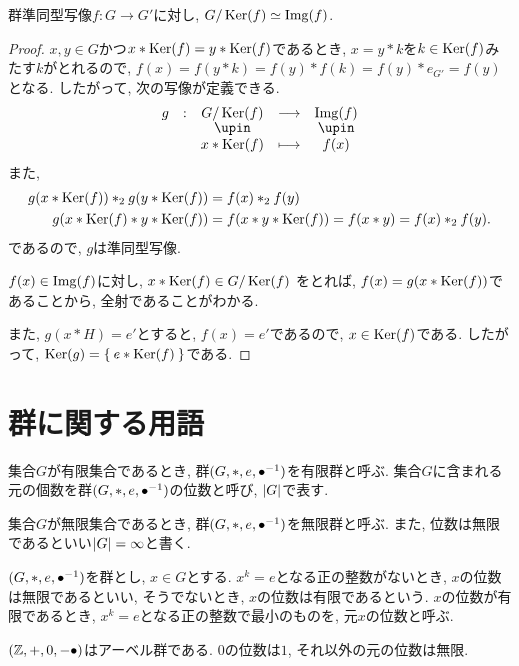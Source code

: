 \begin{theorem}
  群準同型写像$f\colon G \to G'$に対し,
  $G/\operatorname{Ker}(f)\simeq \operatorname{Img}(f)$.
\end{theorem}
\begin{proof}
  $x,y\in G$かつ$x\ast \operatorname{Ker}(f)=y\ast\operatorname{Ker}(f)$であるとき,
  $x=y\ast k$を$k\in \operatorname{Ker}(f)$みたす$k$がとれるので,
  $f(x)=f(y\ast k)=f(y)\ast f(k)=f(y)\ast e_{G'}=f(y)$となる.
  したがって, 次の写像が定義できる.
  \begin{align*}
    \shazo{g}{G/\Ker(f)}{\Img(f)}{x\ast \Ker(f)}{f(x)}
  \end{align*}
  また,
  \begin{align*}
      g(x\ast \operatorname{Ker}(f))\ast_2 g(y\ast \operatorname{Ker}(f))&=f(x)\ast_2 f(y) \\
      g(x\ast \operatorname{Ker}(f) \ast y\ast \operatorname{Ker}(f))&=f(x\ast y \ast \operatorname{Ker}(f))=f(x\ast y)=f(x)\ast_2 f(y).
  \end{align*}
  であるので, $g$は準同型写像.
  
  $f(x)\in \operatorname{Img}(f)$に対し, $x\ast \operatorname{Ker}(f) \in G/\operatorname{Ker}(f)$
  をとれば,
  $f(x)=g(x\ast \operatorname{Ker}(f))$であることから,
  全射であることがわかる.
  
  また, $g(x\ast H)=e'$とすると, $f(x)=e'$であるので, $x\in \operatorname{Ker}(f)$である.
  したがって, $\operatorname{Ker}(g)=\Set{e\ast \operatorname{Ker}(f)}$である.
\end{proof}


\section{群に関する用語}
\begin{definition}
  
  集合$G$が有限集合であるとき,
  群$(G,\ast,e,{\bullet}^{-1})$を有限群と呼ぶ.
  集合$G$に含まれる元の個数を群$(G,\ast,e,{\bullet}^{-1})$の位数と呼び,
  $\left|G\right|$で表す.
  
  集合$G$が無限集合であるとき,
  群$(G,\ast,e,{\bullet}^{-1})$を無限群と呼ぶ.
  また, 位数は無限であるといい$\left|G\right|=\infty$と書く.
\end{definition}

\begin{definition}
  $(G,\ast,e,{\bullet}^{-1})$を群とし,
  $x\in G$とする.
  $x^k=e$となる正の整数がないとき,
  $x$の位数は無限であるといい,
  そうでないとき,
  $x$の位数は有限であるという.
  $x$の位数が有限であるとき,
  $x^k=e$となる正の整数で最小のものを,
  元$x$の位数と呼ぶ.
\end{definition}

\begin{example}
  $(\mathbb{Z},+,0,-{\bullet})$はアーベル群である.
  $0$の位数は$1$,
  それ以外の元の位数は無限.
\end{example}


